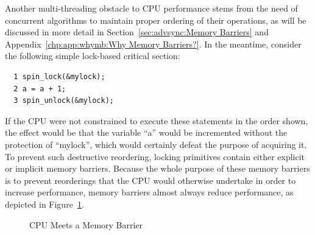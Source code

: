 Another multi-threading obstacle to CPU performance stems from the
need of concurrent algorithms to maintain proper ordering of their
operations, as will be discussed in more detail in
Section~\ref{sec:advsync:Memory Barriers} and
Appendix~\ref{chp:app:whymb:Why Memory Barriers?}.
In the meantime, consider the following simple lock-based critical
section:

\vspace{5pt}
\begin{minipage}[t]{\columnwidth}
\small
\begin{verbatim}
  1 spin_lock(&mylock);
  2 a = a + 1;
  3 spin_unlock(&mylock);
\end{verbatim}
\end{minipage}
\vspace{5pt}

If the CPU were not constrained to execute these statements in the
order shown, the effect would be that the variable ``a'' would be
incremented without the protection of ``mylock'', which would certainly
defeat the purpose of acquiring it.
To prevent such destructive reordering, locking primitives contain
either explicit or implicit memory barriers.
Because the whole purpose of these memory barriers is to prevent reorderings
that the CPU would otherwise undertake in order to increase performance,
memory barriers almost always reduce performance, as depicted in
Figure~\ref{fig:cpu:CPU Meets a Memory Barrier}.

\begin{figure}[htb]
\begin{center}
\end{center}
\caption{CPU Meets a Memory Barrier}
\label{fig:cpu:CPU Meets a Memory Barrier}
\end{figure}

